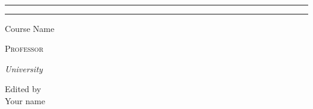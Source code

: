 \vspace{0.75\baselineskip} %

{\huge {}\\} %

\vspace{0.75\baselineskip} %

\rule{\textwidth}{0.4pt}\vspace*{-\baselineskip}\vspace{3.2pt} %
\rule{\textwidth}{1.6pt} %

\vspace{2\baselineskip} %


\LARGE{Course Name} 

\vspace*{3\baselineskip} %



\vspace{0.5\baselineskip} 

{\scshape   \LARGE Professor\\ } %

\vspace{0.2\baselineskip} 

\textit{\Large University} 

\vfill 



\vspace{0.3\baselineskip} 


{\large Edited by\\  Your name}